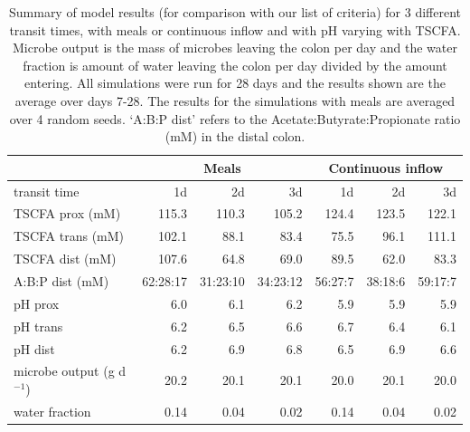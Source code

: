 \documentclass[a4paper]{article}
\begin{document}
\begin{table}[ht]
\caption{Summary of model results (for comparison with our list of criteria) for 3 different transit times, with meals or continuous inflow and with pH varying with TSCFA. Microbe output is the mass of microbes leaving the colon per day and the water fraction is amount of water leaving the colon per day divided by the amount entering. All simulations were run for 28 days and the results shown are the average over days 7-28. The results for the simulations with meals are averaged over 4 random seeds. `A:B:P dist' refers to the Acetate:Butyrate:Propionate ratio (mM) in the distal colon.}
\centering
\small
\begin{tabular}{l|rrr|rrr}
  \hline
  & \multicolumn{3}{c|}{Meals}  & \multicolumn{3}{c}{Continuous  inflow} \\
\hline
transit  time & 1d & 2d & 3d & 1d & 2d & 3d \\ 
  \hline
TSCFA prox  (mM) & 115.3 & 110.3 & 105.2 & 124.4 & 123.5 & 122.1 \\ 
TSCFA trans (mM) & 102.1 & 88.1 & 83.4 & 75.5 & 96.1 & 111.1 \\ 
TSCFA  dist (mM) & 107.6 & 64.8 & 69.0 & 89.5 & 62.0 & 83.3 \\ 
A:B:P dist (mM) & 62:28:17 &31:23:10 & 34:23:12 & 56:27:7 &38:18:6 &59:17:7\\
\hline
pH prox & 6.0& 6.1 & 6.2 & 5.9 & 5.9 & 5.9 \\ 
pH trans & 6.2 & 6.5 & 6.6 & 6.7 & 6.4 & 6.1 \\ 
pH dist & 6.2 & 6.9 & 6.8 & 6.5 & 6.9 & 6.6 \\ 
\hline
microbe  output (g d$^{-1}$) & 20.2 & 20.1 & 20.1 & 20.0 & 20.1 & 20.0 \\ 
water  fraction & 0.14 & 0.04 & 0.02 & 0.14 & 0.04 & 0.02 \\ 
   \hline
\end{tabular}
\label{table:Results}
\end{table}

\end{document}
